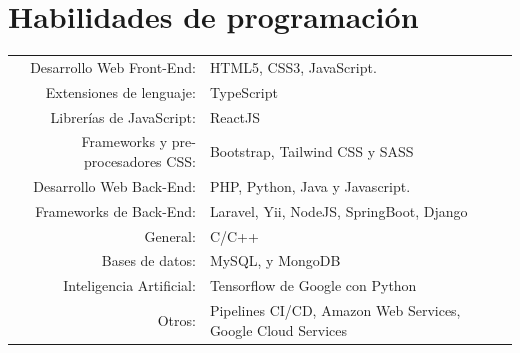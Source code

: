 \documentclass[a4paper,10.9pt]{article}
\begin{document}
\section{Habilidades de programación}
\begin{tabular}{rl}
 Desarrollo Web Front-End:& HTML5, CSS3, JavaScript.\\
 Extensiones de lenguaje:& TypeScript\\
 Librerías de JavaScript:& ReactJS\\
 Frameworks y pre-procesadores CSS:& Bootstrap, Tailwind CSS y SASS\\
 Desarrollo Web Back-End:& PHP, Python, Java y Javascript.\\
 Frameworks de Back-End:& Laravel, Yii, NodeJS, SpringBoot, Django\\
 General:& C/C++\\
 Bases de datos:& MySQL, y MongoDB\\
 Inteligencia Artificial:&  Tensorflow de Google con Python\\
 Otros:& Pipelines CI/CD, Amazon Web Services, Google Cloud Services
\end{tabular}
\end{document}
